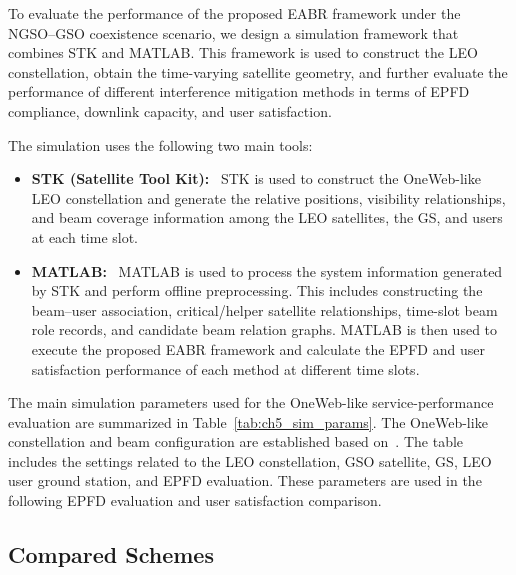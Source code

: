 To evaluate the performance of the proposed EABR framework under the NGSO--GSO coexistence scenario, we design a simulation framework that combines STK and MATLAB. This framework is used to construct the LEO constellation, obtain the time-varying satellite geometry, and further evaluate the performance of different interference mitigation methods in terms of EPFD compliance, downlink capacity, and user satisfaction.

The simulation uses the following two main tools:
\begin{itemize}[leftmargin=*,nosep]
  \item \textbf{STK (Satellite Tool Kit):}~\cite{agi2023stk}
  STK is used to construct the OneWeb-like LEO constellation and generate the relative positions, visibility relationships, and beam coverage information among the LEO satellites, the GS, and users at each time slot.
  \item \textbf{MATLAB:}~\cite{mathworks2023matlab}
  MATLAB is used to process the system information generated by STK and perform offline preprocessing. This includes constructing the beam--user association, critical/helper satellite relationships, time-slot beam role records, and candidate beam relation graphs. MATLAB is then used to execute the proposed EABR framework and calculate the EPFD and user satisfaction performance of each method at different time slots.
\end{itemize}

The main simulation parameters used for the OneWeb-like service-performance evaluation are summarized in Table~\ref{tab:ch5_sim_params}. The OneWeb-like constellation and beam configuration are established based on~\cite{oneweb2016fcc}. The table includes the settings related to the LEO constellation, GSO satellite, GS, LEO user ground station, and EPFD evaluation. These parameters are used in the following EPFD evaluation and user satisfaction comparison.

\subsection{Compared Schemes}

